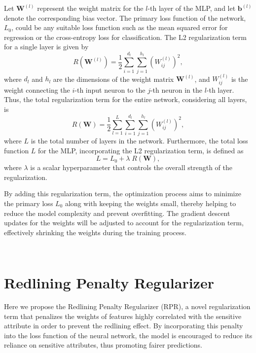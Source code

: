 Let $\mathbf{W}^{(l)}$ represent the weight matrix for the $l$-th layer of the MLP, and let $\mathbf{b}^{(l)}$ denote the corresponding bias vector. The primary loss function of the network, $L_0$, could be any suitable loss function such as the mean squared error for regression or the cross-entropy loss for classification. The L2 regularization term for a single layer is given by
\begin{equation}
R(\mathbf{W}^{(l)}) = \frac{1}{2} \sum_{i=1}^{d_l} \sum_{j=1}^{h_l} \left( W^{(l)}_{ij} \right)^2,
\end{equation}
where $d_l$ and $h_l$ are the dimensions of the weight matrix $\mathbf{W}^{(l)}$, and $W^{(l)}_{ij}$ is the weight connecting the $i$-th input neuron to the $j$-th neuron in the $l$-th layer. Thus, the total regularization term for the entire network, considering all layers, is
\begin{equation}
R(\mathbf{W}) = \frac{1}{2} \sum_{l=1}^{L} \sum_{i=1}^{d_l} \sum_{j=1}^{h_l} \left( W^{(l)}_{ij} \right)^2,
\end{equation}
where $L$ is the total number of layers in the network. Furthermore, the total loss function $L$ for the MLP, incorporating the L2 regularization term, is defined as
\begin{equation}
L = L_0 + \lambda \; R(\mathbf{W}),
\end{equation}
where $\lambda$ is a scalar hyperparameter that controls the overall strength of the regularization.

By adding this regularization term, the optimization process aims to minimize the primary loss $L_0$ along with keeping the weights small, thereby helping to reduce the model complexity and prevent overfitting. The gradient descent updates for the weights will be adjusted to account for the regularization term, effectively shrinking the weights during the training process.

~~\cite{Kamishima2012}

\section{Redlining Penalty Regularizer}

Here we propose the Redlining Penalty Regularizer (RPR), a novel regularization term that penalizes the weights of features highly correlated with the sensitive attribute in order to prevent the redlining effect. By incorporating this penalty into the loss function of the neural network, the model is encouraged to reduce its reliance on sensitive attributes, thus promoting fairer predictions.

